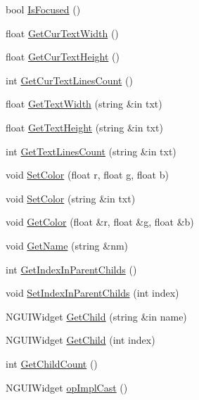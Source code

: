 \begin{DoxyCompactItemize}
bool \hyperlink{class_n_g_u_i_text_drawer_aef877469baba629f962b257be05d62c1}{Is\+Focused} ()
\item 
float \hyperlink{class_n_g_u_i_text_drawer_a3385deb122aa39bf35140b7db77c196f}{Get\+Cur\+Text\+Width} ()
\item 
float \hyperlink{class_n_g_u_i_text_drawer_aae5146dd7e36bf6611a17436f0f2c5bc}{Get\+Cur\+Text\+Height} ()
\item 
int \hyperlink{class_n_g_u_i_text_drawer_a36ca6165548777d898f0baea33a77bad}{Get\+Cur\+Text\+Lines\+Count} ()
\item 
float \hyperlink{class_n_g_u_i_text_drawer_aba3836d78e53e64f3700a50d3d5bd955}{Get\+Text\+Width} (string \&in txt)
\item 
float \hyperlink{class_n_g_u_i_text_drawer_af6bb86051e724b231808e6aca6d9b9ad}{Get\+Text\+Height} (string \&in txt)
\item 
int \hyperlink{class_n_g_u_i_text_drawer_ae02166d5e1efd5a139812cde629eaf7c}{Get\+Text\+Lines\+Count} (string \&in txt)
\item 
void \hyperlink{class_n_g_u_i_text_drawer_a0f86790d4e3c9674f1b8fe4bb0323980}{Set\+Color} (float r, float g, float b)
\item 
void \hyperlink{class_n_g_u_i_text_drawer_ab44402c0d86886a2be0eac3b932aebf1}{Set\+Color} (string \&in txt)
\item 
void \hyperlink{class_n_g_u_i_text_drawer_a71bdcf85de2f25e6ddfe97feade3d64f}{Get\+Color} (float \&r, float \&g, float \&b)
\item 
void \hyperlink{class_n_g_u_i_text_drawer_acfd91a85c3f080cca9ab2823451f53fe}{Get\+Name} (string \&nm)
\item 
int \hyperlink{class_n_g_u_i_text_drawer_a3a9edae35e6d13b579d8919f362e7481}{Get\+Index\+In\+Parent\+Childs} ()
\item 
void \hyperlink{class_n_g_u_i_text_drawer_a749cfea56538b59344a32c310db1796a}{Set\+Index\+In\+Parent\+Childs} (int index)
\item 
N\+G\+U\+I\+Widget \hyperlink{class_n_g_u_i_text_drawer_af6994f70057afc73e12ab6ed2d0cbdf3}{Get\+Child} (string \&in name)
\item 
N\+G\+U\+I\+Widget \hyperlink{class_n_g_u_i_text_drawer_a889ab00433320e1b5955d832e0aef192}{Get\+Child} (int index)
\item 
int \hyperlink{class_n_g_u_i_text_drawer_ad5375e3d9b25452e072203230876913c}{Get\+Child\+Count} ()
\item 
N\+G\+U\+I\+Widget \hyperlink{class_n_g_u_i_text_drawer_ab5bf74d124af6d7e9f583b815cc6dcd2}{op\+Impl\+Cast} ()

\end{DoxyCompactItemize}
